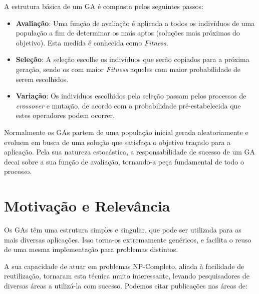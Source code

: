 A estrutura básica de um GA é composta pelos seguintes passos:

\begin{itemize}

 \item \textbf{Avaliação}: Uma função de avaliação é aplicada a todos os indivíduos de uma população a fim de determinar os mais aptos (soluções mais próximas do objetivo). Esta medida é conhecida como \textit{Fitness}. 
 
 \item \textbf{Seleção}: A seleção escolhe os indivíduos que serão copiados para a próxima geração, sendo os com maior \textit{Fitness} aqueles com maior probabilidade de serem escolhidos.
 
 \item \textbf{Variação}: Os indivíduos escolhidos pela seleção passam pelos processos de \textit{crossover} e mutação, de acordo com a probabilidade pré-estabelecida que estes operadores podem ocorrer.
 
\end{itemize} 

Normalmente os GAs partem de uma população inicial gerada aleatoriamente e evoluem em busca de uma solução que satisfaça o objetivo traçado para a aplicação. Pela sua natureza estocástica, a responsabilidade de sucesso de um GA decai sobre a sua função de avaliação, tornando-a peça fundamental de todo o processo.

\section{Motivação e Relevância}

Os GAs têm uma estrutura simples e singular, que pode ser utilizada para as mais diversas aplicações. Isso torna-os extremamente genéricos, e facilita o reuso de uma mesma implementação para problemas distintos.

A sua capacidade de atuar em problemas NP-Completo, aliada à facilidade de reutilização, tornaram esta técnica muito interessante, levando pesquisadores de diversas áreas a utilizá-la com sucesso. Podemos citar publicações nas áreas de:
 
